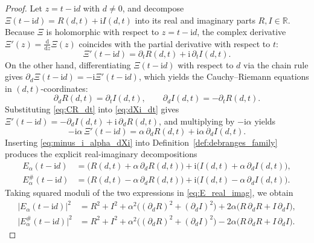 \documentclass[11pt,reqno,a4paper]{amsart}
\theoremstyle{plain}
\theoremstyle{definition}
\theoremstyle{remark}
\numberwithin{equation}{section}
\newcommand{\dd}{\mathrm{d}}
\newcommand{\ii}{\mathrm{i}}
\begin{document}
\begin{proof}
Let $z = t - \ii d$ with $d \neq 0$, and decompose $\Xi(t - \ii d) = R(d,t) + \ii I(d,t)$ into its real and imaginary parts $R,I \in \mathbb{R}$. Because $\Xi$ is holomorphic with respect to $z = t - \ii d$, the complex derivative $\Xi'(z) = \frac{\dd}{\dd z}\Xi(z)$ coincides with the partial derivative with respect to $t$:
\begin{equation}\label{eq:dXi_dt}
  \Xi'(t - \ii d) = \partial_t R(d,t) + \ii\,\partial_t I(d,t).
\end{equation}
On the other hand, differentiating $\Xi(t - \ii d)$ with respect to $d$ via the chain rule gives $\partial_d\Xi(t - \ii d) = -\ii\Xi'(t - \ii d)$, which yields the Cauchy--Riemann equations in $(d,t)$-coordinates:
\begin{equation}\label{eq:CR_dt}
  \partial_d R(d,t) = \partial_t I(d,t), \qquad
  \partial_d I(d,t) = -\partial_t R(d,t).
\end{equation}
Substituting \eqref{eq:CR_dt} into \eqref{eq:dXi_dt} gives $\Xi'(t - \ii d) = -\partial_d I(d,t) + \ii\,\partial_d R(d,t)$, and multiplying by $-\ii\alpha$ yields
\begin{equation}\label{eq:minus_i_alpha_dXi}
  -\ii\alpha\,\Xi'(t - \ii d) = \alpha\,\partial_d R(d,t) + \ii\alpha\,\partial_d I(d,t).
\end{equation}
Inserting \eqref{eq:minus_i_alpha_dXi} into Definition~\ref{def:debranges_family} produces the explicit real-imaginary decompositions
\begin{equation}\label{eq:E_real_imag}
\begin{aligned}
  E_\alpha(t - \ii d) &= \big(R(d,t) + \alpha\,\partial_d R(d,t)\big) + \ii\big(I(d,t) + \alpha\,\partial_d I(d,t)\big), \\
  E_\alpha^\#(t - \ii d) &= \big(R(d,t) - \alpha\,\partial_d R(d,t)\big) + \ii\big(I(d,t) - \alpha\,\partial_d I(d,t)\big).
\end{aligned}
\end{equation}
Taking squared moduli of the two expressions in \eqref{eq:E_real_imag}, we obtain
\begin{align}
  \big|E_\alpha(t - \ii d)\big|^2
  &= R^2 + I^2 + \alpha^2\big((\partial_d R)^2 + (\partial_d I)^2\big) + 2\alpha\big(R\,\partial_d R + I\,\partial_d I\big), \label{eq:mod_E_plus} \\
  \big|E_\alpha^\#(t - \ii d)\big|^2
  &= R^2 + I^2 + \alpha^2\big((\partial_d R)^2 + (\partial_d I)^2\big) - 2\alpha\big(R\,\partial_d R + I\,\partial_d I\big). \label{eq:mod_E_minus}

\end{align}
\end{proof}
\end{document}
